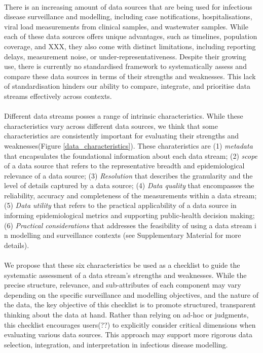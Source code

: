 \documentclass{article}
\begin{document}
\paragraph{}There is an increasing amount of data sources that are being used for infectious disease surveillance and modelling, including case notifications, hospitalisations, viral load measurements from clinical samples, and wastewater samples. While each of these data sources offers unique advantages, such as timelines, population coverage, and XXX, they also come with distinct limitations, including reporting delays,  measurement noise, or under-representativeness. Despite their growing use, there is currently no standardised framework to systematically assess and compare these data sources in terms of their strengths and weaknesses. This lack of standardisation hinders our ability to compare, integrate, and prioritise data streams effectively across contexts. 
\paragraph{}Different data streams posses a range of intrinsic characteristics. While these characteristics vary across different data sources, we think that some characteristics are consistently important for evaluating their strengths and weaknesses(Figure \ref{data_characteristics}).  These charateristics are (1) \textit{metadata}  that encapsulates the foundational information about each data stream; (2) \textit{scope} of a data source that refers to the representative breadth and epidemiological relevance of a data source; (3) \textit{Resolution} that describes the granularity and the level of details captured by a data source; (4) \textit{Data quality} that encompasses the reliability, accuracy and completeness of the measurements within a data stream; (5) \textit{Data utility} that refers to the practical applicability of a data source in informing epidemiological metrics and supporting public-health decision making; (6)\textit{ Practical considerations} that addresses the feasibility of using a data stream i n modelling and surveillance contexts (see Supplementary Material for more details). 
\paragraph{}We propose that these six characteristics be used as a checklist to guide the systematic assessment of a data stream's strengths and weaknesses. While the precise structure, relevance, and sub-attributes of each component may vary depending on the specific surveillance and modelling objectives, and the nature of the data, the key objective of this checklist is to promote structured, transparent thinking about the data at hand. Rather than relying on ad-hoc or judgments, this checklist encourages users(??) to explicitly consider critical dimensions when evaluating various data sources. This approach may support more rigorous data selection, integration, and interpretation in infectious disease modelling. 
\end{document}
